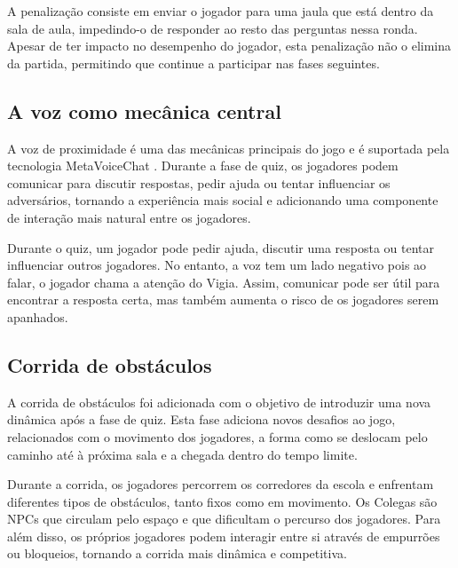 A penalização consiste em enviar o jogador para uma jaula que está dentro da sala de aula, impedindo-o de responder ao resto das perguntas nessa ronda. Apesar de ter impacto no desempenho do jogador, esta penalização não o elimina da partida, permitindo que continue a participar nas fases seguintes.


\subsection{A voz como mecânica central}
\label{subsec:voz}

A voz de proximidade é uma das mecânicas principais do jogo e é suportada pela tecnologia MetaVoiceChat \cite{Metater2024}. Durante a fase de quiz, os jogadores podem comunicar para discutir respostas, pedir ajuda ou tentar influenciar os adversários, tornando a experiência mais social e adicionando uma componente de interação mais natural entre os jogadores.

Durante o quiz, um jogador pode pedir ajuda, discutir uma resposta ou tentar influenciar outros jogadores. No entanto, a voz tem um lado negativo pois ao falar, o jogador chama a atenção do Vigia. Assim, comunicar pode ser útil para encontrar a resposta certa, mas também aumenta o risco de os jogadores serem apanhados.


\subsection{Corrida de obstáculos}
\label{subsec:corrida}

A corrida de obstáculos foi adicionada com o objetivo de introduzir uma nova dinâmica após a fase de quiz. Esta fase adiciona novos desafios ao jogo, relacionados com o movimento dos jogadores, a forma como se deslocam pelo caminho até à próxima sala e a chegada dentro do tempo limite.

Durante a corrida, os jogadores percorrem os corredores da escola e enfrentam diferentes tipos de obstáculos, tanto fixos como em movimento. Os Colegas são NPCs que circulam pelo espaço e que dificultam o percurso dos jogadores. Para além disso, os próprios jogadores podem interagir entre si através de empurrões ou bloqueios, tornando a corrida mais dinâmica e competitiva.

